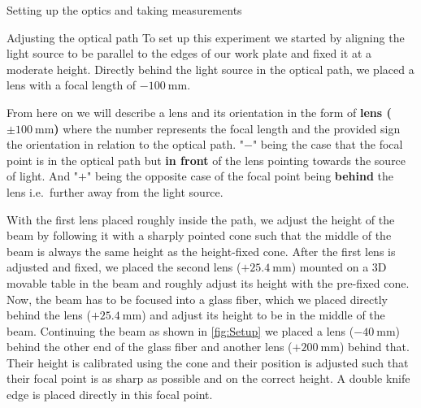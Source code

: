 \documentclass[pdftex, a4paper,11pt, twoside, UKenglish]{report}
\begin{document}
\begin{chapter}{Setting up the optics and taking measurements}
    \newpage
    \begin{section}{Adjusting the optical path}
      \label{chp:SetupOptics}
      To set up this experiment we started by aligning the light source to be
      parallel to the edges of our work plate and fixed it at a moderate height.
      Directly behind the light source in the optical path, we placed a lens
      with a focal length of $\SI{-100}{\milli\meter}$.
      
      From here on we will describe a lens and its orientation in the form of
      \textbf{lens ($\pm \SI{100}{\milli\meter}$)} where the number
      represents the focal length and the provided sign the orientation in
      relation to the optical path. "$-$" being the case that the focal point is
      in the optical path but \textbf{in front} of the lens pointing towards the
      source of light. And "$+$" being the opposite case of the focal point 
      being \textbf{behind} the lens i.e.\ further away from the light source.
      
      With the first lens placed roughly inside the path, we adjust the height
      of the beam by following it with a sharply pointed cone such that the
      middle of the beam is always the same height as the height-fixed cone.
      After the first lens is adjusted and fixed, we placed the second 
      lens ($+\SI{25.4}{\milli\meter}$) mounted on a 3D movable table in the
      beam and roughly adjust its height with the pre-fixed cone.
      Now, the beam has to be focused into a glass fiber, which we placed
      directly behind the lens ($+\SI{25.4}{\milli\meter}$) and adjust its
      height to be in the middle of the beam. Continuing the beam as shown in
      \cref{fig:Setup} we placed a lens ($\SI{-40}{\milli\meter}$) behind the
      other end of the glass fiber and another lens ($+\SI{200}{\milli\meter}$)
      behind that. Their height is calibrated using the cone and their position
      is adjusted such that their focal point is as sharp as possible and on the
      correct height.
      A double knife edge is placed directly in this focal point.
      

\end{section}
\end{chapter}
\end{document}
